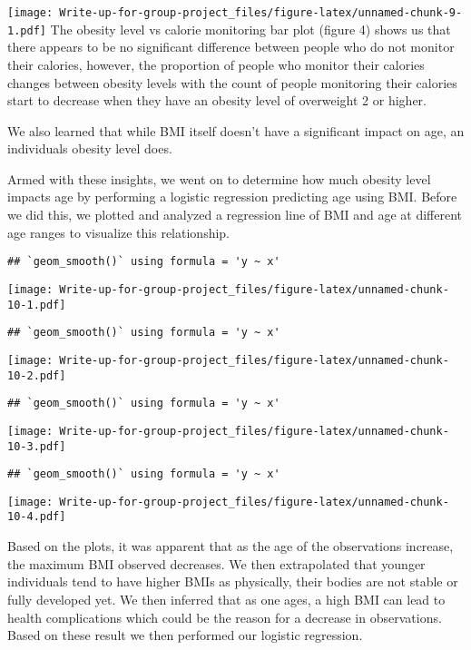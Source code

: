 \documentclass[
]{article}
\begin{document}
\texttt{[image: Write-up-for-group-project\_files/figure-latex/unnamed-chunk-9-1.pdf]}
The obesity level vs calorie monitoring bar plot (figure 4) shows us
that there appears to be no significant difference between people who do
not monitor their calories, however, the proportion of people who
monitor their calories changes between obesity levels with the count of
people monitoring their calories start to decrease when they have an
obesity level of overweight 2 or higher.

We also learned that while BMI itself doesn't have a significant impact
on age, an individuals obesity level does.

Armed with these insights, we went on to determine how much obesity
level impacts age by performing a logistic regression predicting age
using BMI. Before we did this, we plotted and analyzed a regression line
of BMI and age at different age ranges to visualize this relationship.

\begin{verbatim}
## `geom_smooth()` using formula = 'y ~ x'
\end{verbatim}

\texttt{[image: Write-up-for-group-project\_files/figure-latex/unnamed-chunk-10-1.pdf]}

\begin{verbatim}
## `geom_smooth()` using formula = 'y ~ x'
\end{verbatim}

\texttt{[image: Write-up-for-group-project\_files/figure-latex/unnamed-chunk-10-2.pdf]}

\begin{verbatim}
## `geom_smooth()` using formula = 'y ~ x'
\end{verbatim}

\texttt{[image: Write-up-for-group-project\_files/figure-latex/unnamed-chunk-10-3.pdf]}

\begin{verbatim}
## `geom_smooth()` using formula = 'y ~ x'
\end{verbatim}

\texttt{[image: Write-up-for-group-project\_files/figure-latex/unnamed-chunk-10-4.pdf]}

Based on the plots, it was apparent that as the age of the observations
increase, the maximum BMI observed decreases. We then extrapolated that
younger individuals tend to have higher BMIs as physically, their bodies
are not stable or fully developed yet. We then inferred that as one
ages, a high BMI can lead to health complications which could be the
reason for a decrease in observations. Based on these result we then
performed our logistic regression.
\end{document}
